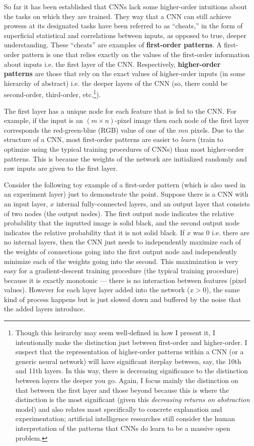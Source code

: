 \documentclass{article}
\renewcommand{\bf}{\textbf}
\renewcommand{\it}{\textit}
\begin{document}
So far it has been established that CNNs lack some higher-order intuitions about the tasks on which they are trained. They way that a CNN can still achieve prowess at its designated tasks have been referred to as ``cheats,'' in the form of superficial statistical and correlations between inputs, as opposed to true, deeper understanding.
These ``cheats'' are examples of \bf{first-order patterns}.
A first-order pattern is one that relies exactly on the values of the first-order information about inputs i.e. the first layer of the CNN.
Respectively, \bf{higher-order patterns} are those that rely on the exact values of higher-order inputs (in some hierarchy of abstract) i.e. the deeper layers of the CNN (so, there could be second-order, third-order, etc.\footnote{Though this heirarchy may seem well-defined in how I present it, I intentionally make the distinction just between first-order and higher-order. I suspect that the representation of higher-order patterns within a CNN (or a generic neural network) will have significant iterplay between, say, the 10th and 11th layers. In this way, there is decreasing significance to the distinction between layers the deeper you go. Again, I focus mainly the distinction on that between the first layer and those beyond because this is where the distinction is the most significant (given this \it{decreasing returns on abstraction} model) and also relates most specifically to concrete explanation and experimentation; artificial intelligence researches still consider the human interpretation of the patterns that CNNs do learn to be a massive open problem.}).

The first layer has a unique node for each feature that is fed to the CNN.
For example, if the input is an $(m \times n)$-pixel image then each node of the first layer corresponds the red-green-blue (RGB) value of one of the $m n$ pixels.
Due to the structure of a CNN, most first-order patterns are easier to \it{learn} (train to optimize using the typical training procedures of CNNs) than most higher-order patterns.
This is because the weights of the network are initialized randomly and raw inputs are given to the first layer.

Consider the following toy example of a first-order pattern (which is also used in an experiment layer) just to demonstrate the point.
Suppose there is a CNN with an input layer, $x$ internal fully-connected layers, and an output layer that consists of two nodes (the output nodes).
The first output node indicates the relative probability that the inputted image is solid black, and the second output node indicates the relative probability that it is not solid black.
If $x$ was $0$ i.e. there are no internal layers, then the CNN just needs to independently maximize each of the weights of connections going into the first output node and independently minimize each of the weights going into the second.
This maximization is very easy for a gradient-descent training procedure (the typical training procedure) because it is exactly monotonic --- there is no interaction between features (pixel values).
However for each layer layer added into the network ($x > 0$),
the same kind of process happens but is just slowed down and buffered by the noise that the added layers introduce.
\end{document}
